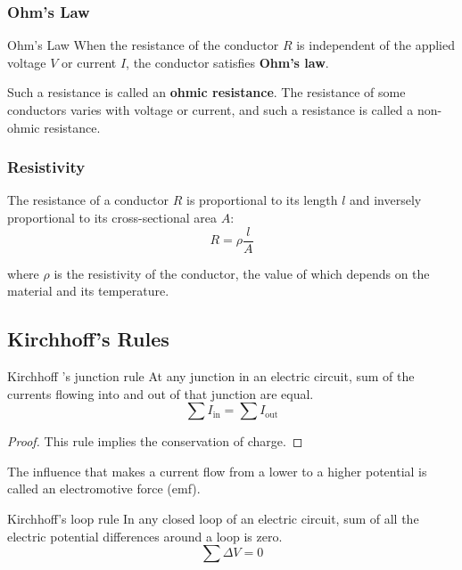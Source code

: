\subsubsection{Ohm's Law}
\begin{thrm}{Ohm's Law}{}
When the resistance of the conductor $R$ is independent of the applied voltage $V$ or current $I$, the conductor satisfies \textbf{Ohm’s law}.

Such a resistance is called an \textbf{ohmic resistance}. The resistance of some conductors varies with voltage or current, and such a resistance is called a non-ohmic resistance.
\end{thrm}

\subsubsection{Resistivity}
The resistance of a conductor $R$ is proportional to its length $l$ and
inversely proportional to its cross-sectional area $A$:
\begin{equation}
{R = \rho \frac{l}{A}
}\end{equation}

where $\rho$ is the resistivity of the conductor, the value of which depends on the material and its temperature.

\subsection{Kirchhoff’s Rules}
\begin{thrm}{Kirchhoff ’s junction rule}{}
At any junction in an electric circuit, sum of the currents flowing into and out of that junction are equal.
\begin{equation}
\sum I_\text{in} = \sum I_\text{out}
\end{equation}
\end{thrm}

\begin{proof}
This rule implies the conservation of charge.
\end{proof}

The influence that makes a current flow from a lower to a higher potential is called an electromotive force (emf).

\begin{thrm}{Kirchhoff’s loop rule}{}
In any closed loop of an electric circuit, sum of all the electric potential differences around a loop is zero.
\[ \sum \Delta V = 0 \]
\end{thrm}
\pagebreak

